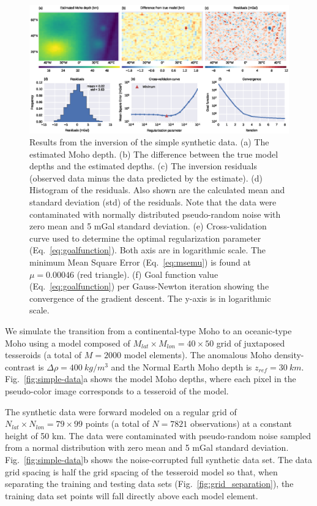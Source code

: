 \documentclass[extra]{gji}
\begin{document}
\begin{figure}
    \centering
    \includegraphics[width=\textwidth]{figures/synthetic-simple-results}
    \caption{
        Results from the inversion of the simple synthetic data.
        (a) The estimated Moho depth.
        (b) The difference between the true model depths
        and the estimated depths.
        (c) The inversion residuals (observed data minus
        the data predicted by the estimate).
        (d) Histogram of the residuals. Also shown are the calculated
        mean and standard deviation (std) of the residuals.
        Note that the data were contaminated with normally distributed
        pseudo-random noise with zero mean and 5 mGal standard deviation.
        (e) Cross-validation curve used to determine the optimal regularization
        parameter (Eq.~\ref{eq:goalfunction}).
        Both axis are in logarithmic scale.
        The minimum Mean Square Error (Eq.~\ref{eq:msemu}) is found at
        $\mu = 0.00046$ (red triangle).
        (f) Goal function value (Eq.~\ref{eq:goalfunction}) per Gauss-Newton
        iteration showing the convergence of the gradient descent.
        The y-axis is in logarithmic scale.
    }
    \label{fig:simple-results}
\end{figure}

We simulate the transition from a continental-type Moho to an oceanic-type Moho
using a model composed of $M_{lat} \times M_{lon} = 40 \times 50$ grid of
juxtaposed tesseroids (a total of $M = 2000$ model elements).
The anomalous Moho density-contrast is $\Delta\rho = 400\ kg/m^3$
and the Normal Earth Moho depth is $z_{ref} = 30\ km$.
Fig.~\ref{fig:simple-data}a shows the model Moho depths,
where each pixel in the pseudo-color image corresponds to
a tesseroid of the model.

The synthetic data were forward modeled on a regular grid of
$N_{lat} \times N_{lon} = 79 \times 99$ points
(a total of $N = 7821$ observations)
at a constant height of 50 km.
The data were contaminated with pseudo-random noise
sampled from a normal distribution with zero mean and 5 mGal standard deviation.
Fig.~\ref{fig:simple-data}b shows the noise-corrupted full synthetic data set.
The data grid spacing is half the grid spacing of the tesseroid model
so that, when separating the training and testing data sets
(Fig.~\ref{fig:grid_separation}),
the training data set points will fall directly above each model element.
\end{document}
